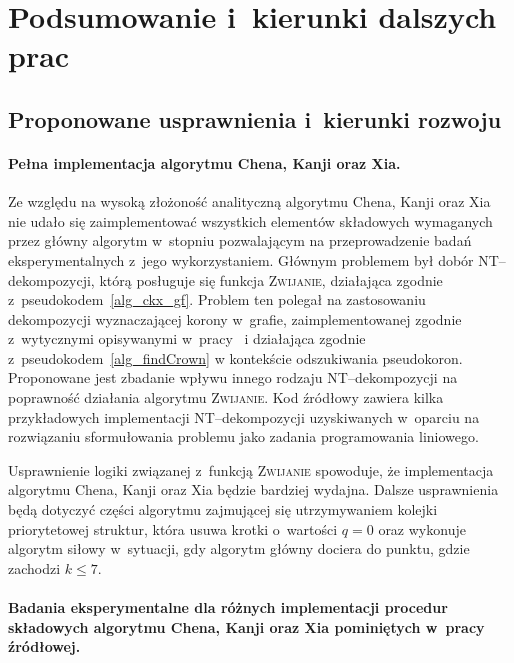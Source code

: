 \chapter{Podsumowanie i~kierunki dalszych prac}
\label{summary}
\section*{Proponowane usprawnienia i~kierunki rozwoju}\label{s_improvements}
\addtocounter{section}{1}
  \subsubsection{\textbf{Pełna implementacja algorytmu Chena, Kanji oraz Xia.}}\label{sss_problems_ckx}

  Ze względu na wysoką złożoność analityczną algorytmu Chena, Kanji oraz Xia nie udało się zaimplementować wszystkich elementów składowych wymaganych przez główny algorytm w~stopniu pozwalającym na przeprowadzenie badań eksperymentalnych z~jego wykorzystaniem.
  Głównym problemem był dobór NT--dekompozycji, którą posługuje się funkcja \textsc{Zwijanie}, działająca zgodnie z~pseudokodem~\ref{alg_ckx_gf}.
  Problem ten polegał na zastosowaniu dekompozycji wyznaczającej korony w~grafie, zaimplementowanej zgodnie z~wytycznymi opisywanymi w~pracy~\cite{KernelizationAlgorithms04} i działająca zgodnie z~pseudokodem~\ref{alg_findCrown} w kontekście odszukiwania pseudokoron.
  Proponowane jest zbadanie wpływu innego rodzaju NT--dekompozycji na poprawność działania algorytmu \textsc{Zwijanie}.
  Kod źródłowy zawiera kilka przykładowych implementacji NT--dekompozycji uzyskiwanych w~oparciu na rozwiązaniu sformułowania problemu jako zadania programowania liniowego.

  Usprawnienie logiki związanej z~funkcją \textsc{Zwijanie} spowoduje, że implementacja algorytmu Chena, Kanji oraz Xia będzie bardziej wydajna.
  Dalsze usprawnienia będą dotyczyć części algorytmu zajmującej się utrzymywaniem kolejki priorytetowej struktur, która usuwa krotki o~wartości $q = 0$ oraz wykonuje algorytm siłowy w~sytuacji, gdy algorytm główny dociera do punktu, gdzie zachodzi $k \leq 7$.

  \subsubsection{\textbf{Badania eksperymentalne dla różnych implementacji procedur składowych algorytmu Chena, Kanji oraz Xia pominiętych w~pracy źródłowej.}}

